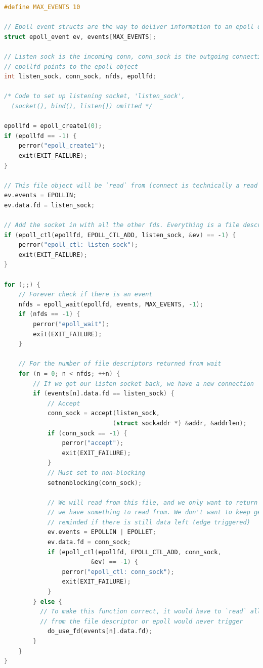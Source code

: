 \begin{lstlisting}[language=C]
#define MAX_EVENTS 10

// Epoll event structs are the way to deliver information to an epoll device
struct epoll_event ev, events[MAX_EVENTS];

// Listen sock is the incoming conn, conn_sock is the outgoing connection, nfds is number of file des
// epollfd points to the epoll object
int listen_sock, conn_sock, nfds, epollfd;

/* Code to set up listening socket, 'listen_sock',
  (socket(), bind(), listen()) omitted */

epollfd = epoll_create1(0);
if (epollfd == -1) {
    perror("epoll_create1");
    exit(EXIT_FAILURE);
}

// This file object will be `read` from (connect is technically a read operation)
ev.events = EPOLLIN;
ev.data.fd = listen_sock;

// Add the socket in with all the other fds. Everything is a file descriptor
if (epoll_ctl(epollfd, EPOLL_CTL_ADD, listen_sock, &ev) == -1) {
    perror("epoll_ctl: listen_sock");
    exit(EXIT_FAILURE);
}

for (;;) {
    // Forever check if there is an event
    nfds = epoll_wait(epollfd, events, MAX_EVENTS, -1);
    if (nfds == -1) {
        perror("epoll_wait");
        exit(EXIT_FAILURE);
    }

    // For the number of file descriptors returned from wait
    for (n = 0; n < nfds; ++n) {
        // If we got our listen socket back, we have a new connection
        if (events[n].data.fd == listen_sock) {
            // Accept
            conn_sock = accept(listen_sock,
                              (struct sockaddr *) &addr, &addrlen);
            if (conn_sock == -1) {
                perror("accept");
                exit(EXIT_FAILURE);
            }
            // Must set to non-blocking
            setnonblocking(conn_sock);

            // We will read from this file, and we only want to return once
            // we have something to read from. We don't want to keep getting
            // reminded if there is still data left (edge triggered)
            ev.events = EPOLLIN | EPOLLET;
            ev.data.fd = conn_sock;
            if (epoll_ctl(epollfd, EPOLL_CTL_ADD, conn_sock,
                        &ev) == -1) {
                perror("epoll_ctl: conn_sock");
                exit(EXIT_FAILURE);
            }
        } else {
          // To make this function correct, it would have to `read` all the data
          // from the file descriptor or epoll would never trigger
            do_use_fd(events[n].data.fd);
        }
    }
}

\end{lstlisting}

